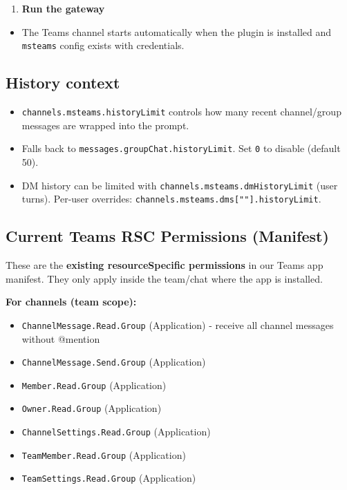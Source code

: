 \begin{enumerate}
  \item \textbf{Run the gateway}
\end{enumerate}

\begin{itemize}
  \item The Teams channel starts automatically when the plugin is installed and \texttt{msteams} config exists with credentials.
\end{itemize}


\subsection{History context}


\begin{itemize}
  \item \texttt{channels.msteams.historyLimit} controls how many recent channel/group messages are wrapped into the prompt.
  \item Falls back to \texttt{messages.groupChat.historyLimit}. Set \texttt{0} to disable (default 50).
  \item DM history can be limited with \texttt{channels.msteams.dmHistoryLimit} (user turns). Per-user overrides: \texttt{channels.msteams.dms[""].historyLimit}.
\end{itemize}


\subsection{Current Teams RSC Permissions (Manifest)}


These are the \textbf{existing resourceSpecific permissions} in our Teams app manifest. They only apply inside the team/chat where the app is installed.

\textbf{For channels (team scope):}

\begin{itemize}
  \item \texttt{ChannelMessage.Read.Group} (Application) - receive all channel messages without @mention
  \item \texttt{ChannelMessage.Send.Group} (Application)
  \item \texttt{Member.Read.Group} (Application)
  \item \texttt{Owner.Read.Group} (Application)
  \item \texttt{ChannelSettings.Read.Group} (Application)
  \item \texttt{TeamMember.Read.Group} (Application)
  \item \texttt{TeamSettings.Read.Group} (Application)
\end{itemize}


